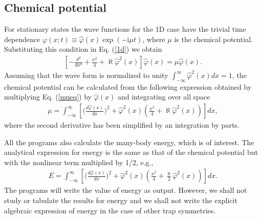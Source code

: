 \documentclass[onecolumn]{elsart3p}
\begin{document}
\subsection{Chemical potential}

\label{CH}


For stationary states the wave functions for the  1D case
have the trivial time
dependence $\varphi(x;t) \equiv \hat  \varphi(x) \exp(-\mbox{i}\mu
t)$,
where
$\mu $ is the chemical potential. Substituting this condition in Eq.
(\ref{1d}) we obtain
\begin{align} \label{mueq}
\left[-\frac{d^2}
{d x^2}+\frac{x^2}{4}+\aleph  %
{\hat \varphi^2(x)}
\right] \hat \varphi (x)
=
  \mu \hat \varphi (x).
\end{align}
Assuming that the wave form is normalized to unity
$\int_{-\infty}^\infty \hat \varphi^2(x) dx =1$, the chemical
potential can
be calculated from the following expression obtained by multiplying
Eq. (\ref{mueq}) by $\hat \varphi (x)$ and integrating over all space
\begin{align}\label{muz}
\mu = \int_{-\infty}^\infty \left[\biggr(\frac{d\hat
\varphi(x)}{dx}
\biggr)^2 +\hat \varphi^2(x)
\left(
\frac{x^2}{4}+\aleph %
{\hat \varphi^2(x)}
\right) \right] dx,
\end{align}
where the second derivative has been simplified by an integration by
parts.

All the programs also calculate the many-body energy, which is of
interest. The analytical expression for energy is the
same as that of the chemical potential but with the nonlinear term
multiplied by 1/2, e.g., \cite{review}
\begin{align}\label{energy}
E = \int_{-\infty}^\infty \left[\biggr(\frac{d\hat
\varphi(x)}{dx}
\biggr)^2 +\hat \varphi^2(x)
\left(
\frac{x^2}{4}+\frac{\aleph} 
{2} {\hat \varphi^2(x)}
\right) \right] dx.
\end{align}
The programs will write the value of energy as output. However, we shall
not study or tabulate the results for energy and we shall not write the
explicit algebraic  expression of energy in the case of other trap
symmetries.
\end{document}
